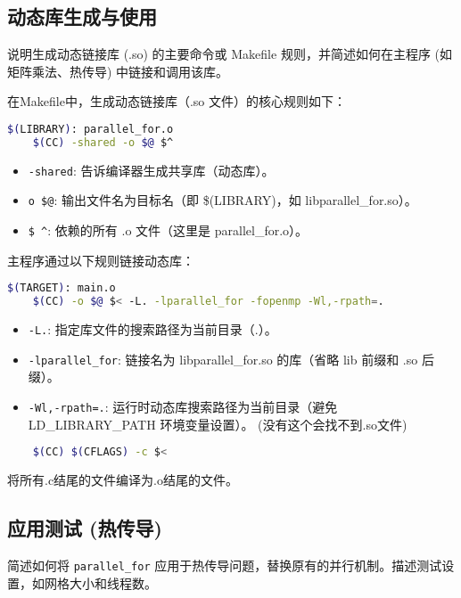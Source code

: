 \documentclass{SYSUReport}
\begin{document}
\subsection{动态库生成与使用}
说明生成动态链接库 (.so) 的主要命令或 Makefile 规则，并简述如何在主程序 (如矩阵乘法、热传导) 中链接和调用该库。


在Makefile中，生成动态链接库（.so 文件）的核心规则如下：

\begin{lstlisting}[language=bash, basicstyle=\ttfamily\small]
$(LIBRARY): parallel_for.o
    $(CC) -shared -o $@ $^
\end{lstlisting}

\begin{itemize}
    \item \texttt{-shared}: 告诉编译器生成共享库（动态库）。
    \item \texttt{o \$@}: 输出文件名为目标名（即 \$(LIBRARY)，如 libparallel\_for.so）。
    \item \texttt{\$ \^}: 依赖的所有 .o 文件（这里是 parallel\_for.o）。
\end{itemize}


主程序通过以下规则链接动态库：

\begin{lstlisting}[language=bash, basicstyle=\ttfamily\small]
$(TARGET): main.o
    $(CC) -o $@ $< -L. -lparallel_for -fopenmp -Wl,-rpath=.
\end{lstlisting}

\begin{itemize}
    \item \texttt{-L.}: 指定库文件的搜索路径为当前目录（.）。
    \item \texttt{-lparallel\_for}: 链接名为 libparallel\_for.so 的库（省略 lib 前缀和 .so 后缀）。
    \item \texttt{-Wl,-rpath=.}: 运行时动态库搜索路径为当前目录（避免 LD\_LIBRARY\_PATH 环境变量设置）。
(没有这个会找不到.so文件)
\end{itemize}
\begin{lstlisting}[language=bash, basicstyle=\ttfamily\small]
%.o: %.c
	$(CC) $(CFLAGS) -c $<
\end{lstlisting}
将所有.c结尾的文件编译为.o结尾的文件。
\subsection{应用测试 (热传导)}
简述如何将 \texttt{parallel\_for} 应用于热传导问题，替换原有的并行机制。描述测试设置，如网格大小和线程数。
\end{document}
